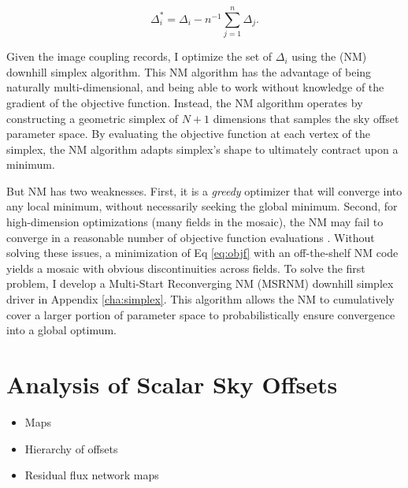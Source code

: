 \documentclass[iop]{emulateapj}
\begin{document}
\begin{equation}
    \Delta_i^* = \Delta_i - n^{-1}\sum_{j=1}^n \Delta_j.
    \label{eq:netzero}
\end{equation}

Given the image coupling records, I optimize the set of $\Delta_i$ using the \cite{Nelder:1965} (NM) downhill simplex algorithm. This NM algorithm has the advantage of being naturally multi-dimensional, and being able to work without knowledge of the gradient of the objective function. Instead, the NM algorithm operates by constructing a geometric simplex of $N+1$ dimensions that samples the sky offset parameter space. By evaluating the objective function at each vertex of the simplex, the NM algorithm adapts simplex's shape to ultimately contract upon a minimum.

But NM has two weaknesses. First, it is a \emph{greedy} optimizer that will converge into any local minimum, without necessarily seeking the global minimum. Second, for high-dimension optimizations (many fields in the mosaic), the NM may fail to converge in a reasonable number of objective function evaluations \citep{Neumann:2006}. Without solving these issues, a minimization of Eq \ref{eq:objf} with an off-the-shelf NM code yields a mosaic with obvious discontinuities across fields. To solve the first problem, I develop a Multi-Start Reconverging NM (MSRNM) downhill simplex driver in Appendix \ref{cha:simplex}. This algorithm allows the NM to cumulatively cover a larger portion of parameter space to probabilistically ensure convergence into a global optimum.

\section{Analysis of Scalar Sky Offsets}

\begin{itemize}
\item Maps
\item Hierarchy of offsets
\item Residual flux network maps
\end{itemize}
\end{document}
